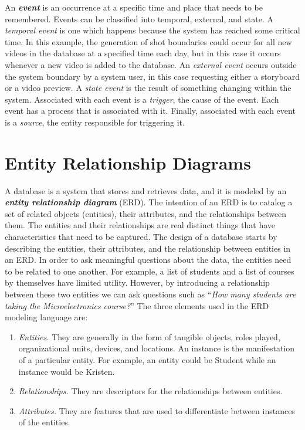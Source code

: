 An \emph{\textbf{event}} is an occurrence at a specific time and place
that needs to be remembered. Events can be classified into temporal,
external, and state. A \emph{temporal event} is one which happens
because the system has reached some critical time. In this example, the
generation of shot boundaries could occur for all new videos in the
database at a specified time each day, but in this case it occurs
whenever a new video is added to the database. An \emph{external event}
occurs outside the system boundary by a system user, in this case
requesting either a storyboard or a video preview. A \emph{state event}
is the result of something changing within the system. Associated with
each event is a \emph{trigger}, the cause of the event. Each event has a
process that is associated with it. Finally, associated with each event
is a \emph{source}, the entity responsible for triggering it.

\section{Entity Relationship Diagrams}
\label{section:entity-relationship-diagrams}

A database is a system that stores and retrieves data, and it is modeled
by an \emph{\textbf{entity relationship diagram}} (ERD). The intention
of an ERD is to catalog a set of related objects (entities), their
attributes, and the relationships between them. The entities and their
relationships are real distinct things that have characteristics that
need to be captured. The design of a database starts by describing the
entities, their attributes, and the relationship between entities in an
ERD. In order to ask meaningful questions about the data, the entities
need to be related to one another. For example, a list of students and a
list of courses by themselves have limited utility. However, by
introducing a relationship between these two entities we can ask
questions such as ``\emph{How many students are taking the
Microelectronics course?}'' The three elements used in the ERD modeling
language are:

\begin{enumerate}
\def\labelenumi{\arabic{enumi}.}
\item
  \emph{Entities.} They are generally in the form of tangible objects,
  roles played, organizational units, devices, and locations. An
  instance is the manifestation of a particular entity. For example, an
  entity could be Student while an instance would be Kristen.
\item
  \emph{Relationships.} They are descriptors for the relationships
  between entities.
\item
  \emph{Attributes.} They are features that are used to differentiate
  between instances of the entities.
\end{enumerate}

